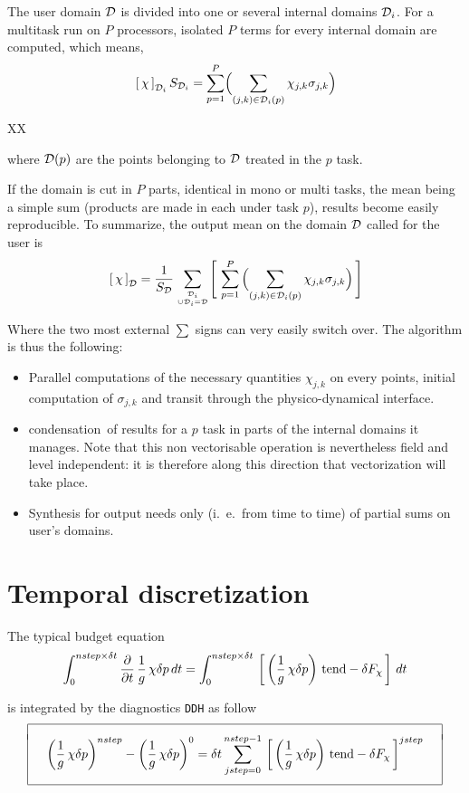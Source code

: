 \ms The user domain $\cal D$  is divided into one or several internal domains ${\cal D}_i$.  For a multitask run on $P$ processors, isolated $P$ terms for every internal domain are computed, which means, 
$$ \lc \chi \rd_{{\cal D}_i} S_{{\cal D}_i} = \sum_{p=1}^P \Bigl( \sum_{(j,k) \in {\cal D}_i (p)} \chi_{j,k} 
\sigma_{j,k} \Bigr) $$

XX

\noi where ${\cal D} (p)$ are the points belonging to $\cal D$ treated in the $p$ task.

If the domain is cut in $P$ parts, identical in mono or multi tasks, the mean being a simple sum (products are made in each under task $p$), results become easily reproducible. To summarize, the output mean on the domain $\cal D$ called for the user is 
$$ \lc \chi\rd_{\cal D} = \frac 1{S_{\cal D}} \sum_{{\cal D}_i \atop {\cup {\cal D}_i = {\cal D}}} \Biggl[ 
\,\,\sum_{p=1}^P \, \Bigl( \sum_{(j,k) \in {\cal D}_i (p)} \chi_{j,k} \sigma_{j,k} \Bigr) \,\Biggr] $$

\noi Where the two most external $\sum$ signs can very easily switch over.
\ms The algorithm is thus the following:
\begin{itemize}
\item Parallel computations of the necessary quantities $\chi_{j,k}$ on every points, initial computation of $\sigma_{j,k}$ and transit through the physico-dynamical interface.
\item \og condensation\fg\ of results for a $p$ task in parts of the internal domains it manages. Note that this non vectorisable operation is nevertheless field and level independent: it is therefore along this direction that vectorization will take place.
\item Synthesis for output needs only (i.\ e.\ from time to time) of partial sums on user's domains. 
\end{itemize}

\section{Temporal discretization}
The typical budget equation
$$ \int_0^{nstep \times \delta t} \DerP{}t \,\frac 1g \, \chi \delta p \,dt =  \int_0^{nstep\times \delta 
t} \lc \lp \frac 1g \, \chi \delta p \rp \, {\rm tend} - \delta F_\chi \rc dt $$

\noi is integrated by the diagnostics {\tt DDH} as follow
$$ \bay{|c|} \hline \\[-1ex]
\quad \ds \lp \frac 1g \, \chi \delta p \rp^{nstep} - \lp \frac 1g \, \chi \delta p \rp^0 = \delta t \sum_{jstep=0}^{nstep-1} 
\lc \lp \frac 1g \, \chi \delta p \rp \, {\rm tend} - \delta F_\chi \rd^{jstep} \quad \\[4ex] \hline \eay 
$$

